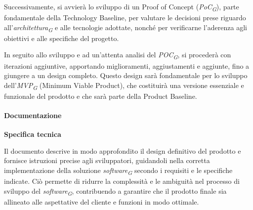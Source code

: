 \vspace{0.2cm}

Successivamente, si avvierà lo sviluppo di un Proof of Concept (\textit{PoC}\textsubscript{\textit{G}}), parte fondamentale della Technology Baseline, per valutare le decisioni prese riguardo all'\textit{architettura}\textsubscript{\textit{G}} e alle tecnologie adottate, nonché per verificarne l'aderenza agli obiettivi e alle specifiche del progetto. 

\vspace{0.2cm}

In seguito allo sviluppo e ad un'attenta analisi del \textit{POC}\textsubscript{\textit{G}}, si procederà con iterazioni aggiuntive, apportando miglioramenti, aggiustamenti e aggiunte, fino a giungere a un design completo. Questo design sarà fondamentale per lo sviluppo dell'\textit{MVP}\textsubscript{\textit{G}} (Minimum Viable Product), che costituirà una versione essenziale e funzionale del prodotto e che sarà parte della Product Baseline.

\paragraph{Documentazione}

\vspace{0.2cm}

\textbf{Specifica tecnica}

Il documento descrive in modo approfondito il design definitivo del prodotto e fornisce istruzioni precise agli sviluppatori, guidandoli nella corretta implementazione della soluzione \textit{software}\textsubscript{\textit{G}} secondo i requisiti e le specifiche indicate. Ciò permette di ridurre la complessità e le ambiguità nel processo di sviluppo del \textit{software}\textsubscript{\textit{G}}, contribuendo a garantire che il prodotto finale sia allineato alle aspettative del cliente e funzioni in modo ottimale.

